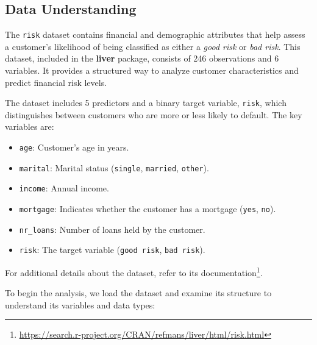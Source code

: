 \documentclass[
  11pt,
]{book}
\providecommand{\tightlist}{%
  \setlength{\itemsep}{0pt}\setlength{\parskip}{0pt}}
\renewcommand{\href}[2]{#2\footnote{\url{#1}}}
\theoremstyle{definition}
\theoremstyle{definition}
\theoremstyle{definition}
\theoremstyle{definition}
\theoremstyle{remark}
\begin{document}
\subsection*{Data Understanding}\label{data-understanding-1}


The \texttt{risk} dataset contains financial and demographic attributes that help assess a customer's likelihood of being classified as either a \emph{good risk} or \emph{bad risk}. This dataset, included in the \textbf{liver} package, consists of 246 observations and 6 variables. It provides a structured way to analyze customer characteristics and predict financial risk levels.

The dataset includes 5 predictors and a binary target variable, \texttt{risk}, which distinguishes between customers who are more or less likely to default. The key variables are:

\begin{itemize}
\tightlist
\item
  \texttt{age}: Customer's age in years.\\
\item
  \texttt{marital}: Marital status (\texttt{single}, \texttt{married}, \texttt{other}).\\
\item
  \texttt{income}: Annual income.\\
\item
  \texttt{mortgage}: Indicates whether the customer has a mortgage (\texttt{yes}, \texttt{no}).\\
\item
  \texttt{nr\_loans}: Number of loans held by the customer.\\
\item
  \texttt{risk}: The target variable (\texttt{good\ risk}, \texttt{bad\ risk}).
\end{itemize}

For additional details about the dataset, refer to its \href{https://search.r-project.org/CRAN/refmans/liver/html/risk.html}{documentation}.

To begin the analysis, we load the dataset and examine its structure to understand its variables and data types:
\end{document}
